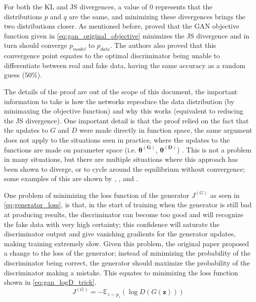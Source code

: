 For both the KL and JS divergences, a value of 0 represents that the distributions $p$ and $q$ are the same, and minimizing these divergences brings the two distributions closer. As mentioned before, \textcite{gans2014} proved that the \gls{GAN} objective function given in \autoref{eq:gan_original_objective} minimizes the JS divergence and in turn should converge $p_{model}$ to $p_{data}$. The authors also proved that this convergence point equates to the optimal discriminator being unable to differentiate between real and fake data, having the same accuracy as a random guess ($50\%$).

The details of the proof are out of the scope of this document, the important information to take is how the networks reproduce the data distribution (by minimaxing the objective function) and why this works (equivalent to reducing the JS divergence). One important detail is that the proof relied on the fact that the updates to $G$ and $D$ were made directly in function space, the same argument does not apply to the situations seen in practice, where the updates to the functions are made on parameter space (i.e. $\bm{\theta^{(G)}}$, $\bm{\theta^{(D)}}$) \cite{nipsGAN2017}. This is not a problem in many situations, but there are multiple situations where this approach has been shown to diverge, or to cycle around the equilibrium without convergence; some examples of this are shown by \textcite{improvedGANS2016}, \textcite{wasserstein2017}, \textcite{wgan-gp2017} and \textcite{which_GAN_converge2018}.

One problem of minimizing the loss function of the generator $J^{(G)}$ as seen in \autoref{eq:generator_loss}, is that, in the start of training when the generator is still bad at producing results, the discriminator can become too good and will recognize the fake data with very high certainty; this confidence will saturate the discriminator output and give vanishing gradients for the generator updates, making training extremely slow. Given this problem, the original paper \cite{gans2014} proposed a change to the loss of the generator; instead of minimizing the probability of the discriminator being correct, the generator should maximize the probability of the discriminator making a mistake. This equates to minimizing the loss function shown in \autoref{eq:gan_logD_trick}.
\begin{equation} \label{eq:gan_logD_trick}
    J^{(G)} = -\mathbb{E}_{z\sim p_{z}}(\log D(G(\bm{z})))
\end{equation}

